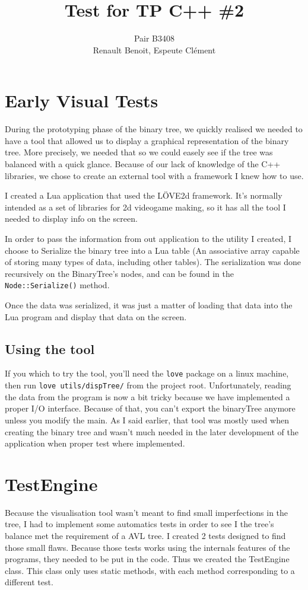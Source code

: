 \documentclass[10pt]{article}
\title{Test for TP C++ \#2}
\author{Pair B3408 \\ {\sc Renault} Benoit, {\sc Espeute} Clément}
\date{}
\begin{document}
\pagestyle{fancy}
\maketitle

\section{Early Visual Tests}
During the prototyping phase of the binary tree, we quickly realised we needed to have a tool that allowed us to display a graphical representation of the binary tree. More precisely, we needed that so we could easely see if the tree was balanced with a quick glance. Because of our lack of knowledge of the C++ libraries, we chose to create an external tool with a framework I knew how to use.

I created a Lua application that used the LÖVE2d framework. It's normally intended as a set of libraries for 2d videogame making, so it has all the tool I needed to display info on the screen.

In order to pass the information from out application to the utility I created, I choose to Serialize the binary tree into a Lua table (An associative array capable of storing many types of data, including other tables). The serialization was done recursively on the BinaryTree's nodes, and can be found in the \texttt{Node::Serialize()} method.

Once the data was serialized, it was just a matter of loading that data into the Lua program and display that data on the screen.

\subsection*{Using the tool}
If you which to try the tool, you'll need the \texttt{love} package on a linux machine, then run \texttt{love~utils/dispTree/} from the project root. Unfortunately, reading the data from the program is now a bit tricky because we have implemented a proper I/O interface. Because of that, you can't export the
binaryTree anymore unless you modify the main. As I said earlier, that tool was mostly used when creating the binary tree and wasn't much needed in the later development of the application when proper test where implemented.

\section{TestEngine}
Because the visualisation tool wasn't meant to find small imperfections in the tree, I had to implement some automatics tests in order to see I the tree's balance met the requirement of a AVL tree. I created 2 tests designed to find those small flaws. Because those tests works using the internals features of the programs, they needed to be put in the code. Thus we created the TestEngine class. This class only uses static methods, with each method corresponding to a different test.
\end{document}
